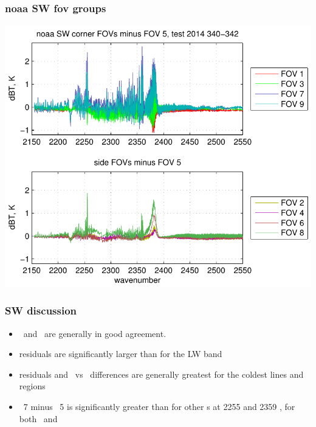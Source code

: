 \documentclass[11pt]{beamer}
\begin{document}
\begin{frame}
\frametitle{noaa SW fov groups}

\begin{center}
  \includegraphics[scale=0.7]{figures/noaa_SW_dif_2014_340-342.pdf}
\end{center}

\end{frame}
\begin{frame}
\frametitle{SW discussion}

\begin{itemize}

  \item \ccast\ and \noaa\ are generally in good agreement.

  \item residuals are significantly larger than for the LW band

  \item residuals and \noaa\ vs \ccast\ differences are generally
    greatest for the coldest lines and regions

  \item \fov\ 7 minus \fov\ 5 is significantly greater than for other
    \fov s at 2255 and 2359 \wnum, for both \ccast\ and \noaa

\end{itemize}

\end{frame}
\end{document}
